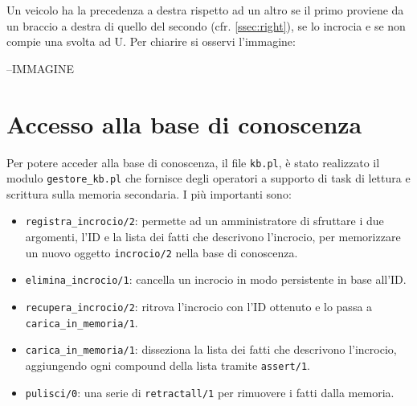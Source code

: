 Un veicolo ha la precedenza a destra rispetto ad un altro se il primo proviene da un braccio a destra di quello del secondo (cfr. \ref{ssec:right}), se lo incrocia e se non compie una svolta ad U. Per chiarire si osservi l'immagine:

--IMMAGINE

%		



\section{Accesso alla base di conoscenza}
Per potere acceder alla base di conoscenza, il file \texttt{kb.pl}, è stato realizzato il modulo \texttt{gestore\_kb.pl} che fornisce degli operatori a supporto di task di lettura e scrittura sulla memoria secondaria. I più importanti sono:
\begin{itemize}
	\item \texttt{registra\_incrocio/2}: permette ad un amministratore di sfruttare i due argomenti, l'ID e la lista dei fatti che descrivono l'incrocio, per memorizzare un nuovo oggetto \texttt{incrocio/2} nella base di conoscenza.
	\item \texttt{elimina\_incrocio/1}: cancella un incrocio in modo persistente in base all'ID.
	\item \texttt{recupera\_incrocio/2}: ritrova l'incrocio con l'ID ottenuto e lo passa a \texttt{carica\_in\_memoria/1}.
	\item \texttt{carica\_in\_memoria/1}: disseziona la lista dei fatti che descrivono l'incrocio, aggiungendo ogni compound della lista tramite \texttt{assert/1}.
	\item \texttt{pulisci/0}: una serie di \texttt{retractall/1} per rimuovere i fatti dalla memoria.
\end{itemize}

